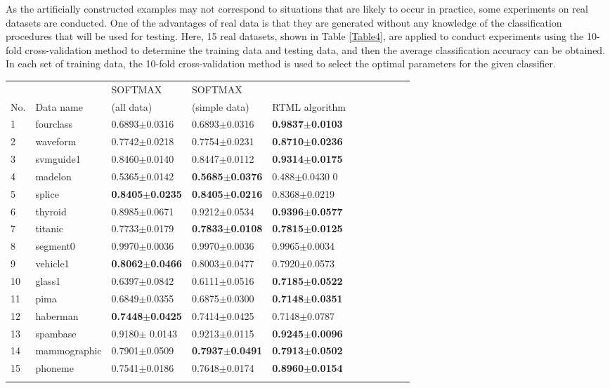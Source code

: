 As the artificially constructed examples may not correspond to situations that are likely to occur in practice, some experiments on real datasets are conducted. One of the advantages of real data is that they are generated without any knowledge of the classification procedures that will be used for testing. Here, 15 real datasets, shown in Table \ref{Table4}, are applied to conduct experiments using the 10-fold cross-validation method to determine the training data and testing data, and then the average classification accuracy can be obtained. In each set of training data, the 10-fold cross-validation method is used to select the optimal parameters for the given classifier.

\begin{table*}[htbp]
\centering
\caption{Experimental results on real datasets for which SOFTMAX is learning method}
 \label{Table4}
\begin{tabular}{lllllllllll}
 \hline\noalign{\smallskip}
    &           &SOFTMAX        &SOFTMAX       & \\
No.	&Data name	&(all data) 	&(simple data)	& RTML algorithm\\
\noalign{\smallskip}\hline\noalign{\smallskip}
1& fourclass  & 0.6893$\pm$0.0316   &0.6893$\pm$0.0316    &\textbf{0.9837$\pm$0.0103}\\
2&	waveform  &0.7742$\pm$0.0218   &0.7754$\pm$0.0231    &\textbf{0.8710$\pm$0.0236}\\
3&	svmguide1 & 0.8460$\pm$0.0140   &0.8447$\pm$0.0112   &\textbf{0.9314$\pm$0.0175}\\
4&	madelon	  & 0.5365$\pm$0.0142    &\textbf{0.5685$\pm$0.0376}  &0.488$\pm$0.0430 0\\
5&	splice	  &\textbf{0.8405$\pm$0.0235}   &\textbf{0.8405$\pm$0.0216}   &0.8368$\pm$0.0219\\
6&	thyroid   &0.8985$\pm$0.0671   &0.9212$\pm$0.0534   &\textbf{0.9396$\pm$0.0577}\\
7&	titanic	  &0.7733$\pm$0.0179&\textbf{0.7833$\pm$0.0108}	&\textbf{0.7815$\pm$0.0125}\\
8&	segment0  &0.9970$\pm$0.0036   &0.9970$\pm$0.0036   &0.9965$\pm$0.0034\\
9&	vehicle1  &\textbf{0.8062$\pm$0.0466}    &0.8003$\pm$0.0477    &0.7920$\pm$0.0573\\
10&	glass1    & 0.6397$\pm$0.0842 &0.6111$\pm$0.0516   &\textbf{0.7185$\pm$0.0522}\\
11&	pima     &0.6849$\pm$0.0355  &0.6875$\pm$0.0300 & \textbf{0.7148$\pm$0.0351}\\
12&	haberman  &\textbf{0.7448$\pm$0.0425}  &0.7414$\pm$0.0425  &0.7148$\pm$0.0787\\

13&	spambase  &  0.9180$\pm$ 0.0143   & 0.9213$\pm$0.0115 &\textbf{0.9245$\pm$0.0096}\\
14&	mammographic   & 0.7901$\pm$0.0509  & \textbf{0.7937$\pm$0.0491} &   \textbf{0.7913$\pm$0.0502}\\
15&	phoneme   &0.7541$\pm$0.0186    &0.7648$\pm$0.0174    &\textbf{0.8960$\pm$0.0154}\\
\noalign{\smallskip}\hline
     \end{tabular}
 \end{table*}


